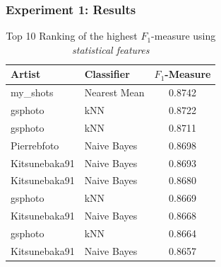 \subsubsection{Experiment 1: Results}


\begin{table}[htb]
    \centering
    \begin{tabular}
        { | l | l | c |} 
        \hline
        Artist & Classifier & $F_1$-Measure \\
        \hline
        my\_shots & Nearest Mean & 0.8742 \\ 
        gsphoto & kNN & 0.8722 \\ 
        gsphoto & kNN & 0.8711 \\ 
        Pierrebfoto & Naive Bayes & 0.8698 \\ 
        Kitsunebaka91 & Naive Bayes & 0.8693 \\
        Kitsunebaka91 & Naive Bayes & 0.8680 \\
        gsphoto & kNN & 0.8669 \\
        Kitsunebaka91 & Naive Bayes & 0.8668 \\
        gsphoto & kNN & 0.8664 \\
        Kitsunebaka91 & Naive Bayes & 0.8657 \\
        \hline 
    \end{tabular}
    \caption{Top 10 Ranking of the highest $F_1$-measure using \textit{statistical features}}
    \label{ex1aresults}
\end{table}

